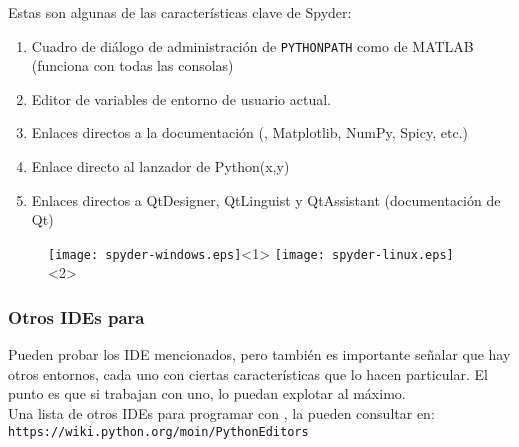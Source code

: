 \begin{frame}[fragile]
Estas son algunas de las características clave de Spyder:
\begin{enumerate}[<+->]
\item Cuadro de diálogo de administración de \texttt{PYTHONPATH} como de MATLAB (funciona con todas las consolas)
\item Editor de variables de entorno de usuario actual.
\item Enlaces directos a la documentación (\python, Matplotlib, NumPy, Spicy, etc.)
\item Enlace directo al lanzador de Python(x,y)
\item Enlaces directos a QtDesigner, QtLinguist y QtAssistant (documentación de Qt)
\end{enumerate}
\end{frame}
\begin{frame}
\begin{figure}
	\centering
	\texttt{[image: spyder-windows.eps]}<1>
	\texttt{[image: spyder-linux.eps]}<2> 
\end{figure}
\end{frame}
\begin{frame}
\frametitle{Otros IDEs para \python}
Pueden probar los IDE mencionados, pero también es importante señalar que hay otros entornos, cada uno con ciertas características que lo hacen particular. El punto es que si trabajan con uno, lo puedan explotar al máximo.
\\
\medskip
Una lista de otros IDEs para programar con \python, la pueden consultar en:
\\
\medskip
\texttt{https://wiki.python.org/moin/PythonEditors}
\end{frame}
